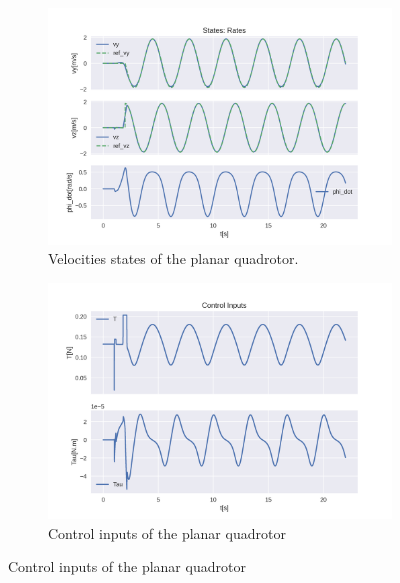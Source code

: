 \documentclass{thesisreport}
\begin{document}
\begin{figure}[H]
\medskip
	\begin{subfigure}{0.48\textwidth}
		\includegraphics[width=\linewidth]{Images/acados_simulations/circular_trajectory/planar_quadrotor/noiseless/rateStates.png}
		\caption{Velocities states of the planar quadrotor.} \label{fig:planar_sim_velocities_noiseless}
	\end{subfigure}\hspace*{\fill}
	\begin{subfigure}{0.48\textwidth}
		\includegraphics[width=\linewidth]{Images/acados_simulations/circular_trajectory/planar_quadrotor/noiseless/controlInputs.png}
		\caption{Control inputs of the planar quadrotor} \label{fig:planar_sim_control_inputs_noiseless}
	\end{subfigure}


\end{figure}
\end{document}
